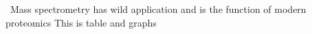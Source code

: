 \ Mass spectrometry has wild application and is the function of modern proteomics 
This is table and graphs
